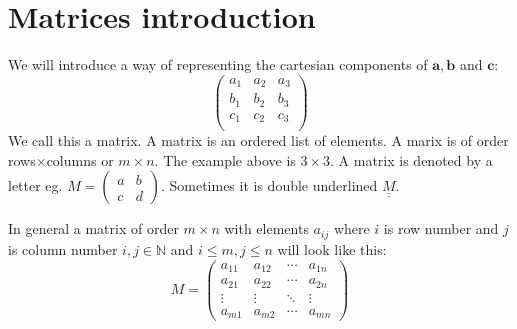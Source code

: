 \documentclass{article}
\renewcommand{\vec}[1]{\bm{#1}}
\newcommand{\vv}[1]{\vec{#1}}
\newcommand{\bb}[1]{\mathbb{#1}}
\newcounter{example}[section]
\begin{document}
\section{Matrices introduction}

We will introduce a way of representing the cartesian components of \(\vv a,\vv b\) and \(\vv c\):
\[
\begin{pmatrix}
a_1 & a_2 & a_3\\
b_1 & b_2 & b_3\\
c_1 & c_2 & c_3\\
\end{pmatrix}
\]
We call this a matrix. A matrix is an ordered list of elements. A marix is of order rows\(\times\)columns or \(m\times n\). The example above is \(3\times3\). A matrix is denoted by a letter eg. \(M=\left(
\begin{smallmatrix}
a & b\\
c & d
\end{smallmatrix}
\right)\). Sometimes it is double underlined \(\underline{\underline{M}}\).

In general a matrix of order \(m\times n\) with elements \(a_{ij}\) where \(i\) is row number and \(j\) is column number \(i,j\in\bb N\) and \(i\le m,j\le n\) will look like this:
\[M=
\begin{pmatrix}
a_{11} & a_{12} & \cdots & a_{1n}\\
a_{21} & a_{22} & \cdots & a_{2n}\\
\vdots & \vdots & \ddots & \vdots\\
a_{m1} & a_{m2} & \cdots & a_{mn}
\end{pmatrix}
\]
\end{document}
